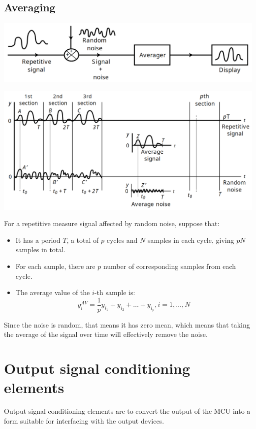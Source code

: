 \documentclass[11pt]{article}
\begin{document}
 \newpage

\subsection{Averaging}
\label{sec:org51c571c}
\begin{center}
\includegraphics[width=.9\linewidth]{./images/averaging-diagram.png}
\end{center}
\begin{center}
\includegraphics[width=.9\linewidth]{./images/averaging-detailed-diagram.png}
\end{center}
For a repetitive measure signal affected by random noise, suppose that:
\begin{itemize}
\item It has a period \(T\), a total of \(p\) cycles and \(N\) samples in each cycle, giving \(pN\) samples in total.
\item For each sample, there are \(p\) number of corresponding samples from each cycle.
\item The average value of the \(i\)-th sample is:
\[y_i^{AV} = \frac{1}{p} y_{i_1} + y_{i_2} + \ldots + y_{i_p}, i = 1, \ldots, N\]
\end{itemize}

Since the noise is random, that means it has zero mean, which means that taking the average of the signal over time will effectively remove the noise.

 \newpage

\section{Output signal conditioning elements}
\label{sec:org3922a72}
Output signal conditioning elements are to convert the output of the MCU into a form suitable for interfacing with the output devices.
\end{document}
